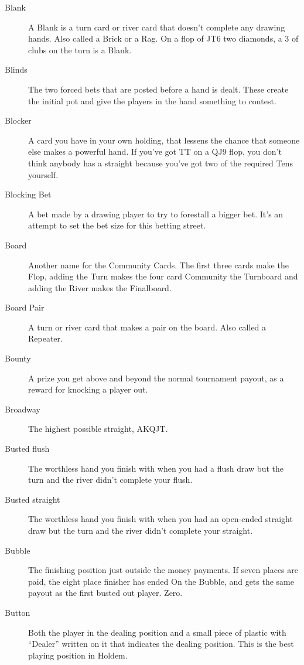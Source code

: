 \begin{description}
\item[Blank] A Blank is a turn card or river card that doesn't
complete any drawing hands. Also called a Brick or a Rag. On a flop of
JT6 two diamonds, a 3 of clubs on the turn is a Blank.

\item[Blinds] The two forced bets that are posted before a hand is
dealt. These create the initial pot and give the players in the hand
something to contest.

\item[Blocker] A card you have in your own holding, that lessens
the chance that someone else makes a powerful hand. If you've got TT
on a QJ9 flop, you don't think anybody has a straight because you've
got two of the required Tens yourself.

\item[Blocking Bet] A bet made by a drawing player to try to forestall
a  bigger bet. It's an attempt to set the bet size for this betting
street.

\item[Board] Another name for the Community Cards. The first three
cards make the Flop, adding the Turn makes the four card Community the
Turnboard and adding the River makes the Finalboard.

\item[Board Pair] A turn or river card that makes a pair on the
board. Also called a Repeater.

\item[Bounty] A prize you get above and beyond the normal tournament
payout, as a reward for knocking a player out.

\item[Broadway] The highest possible straight, AKQJT.

\item[Busted flush] The worthless hand you finish with when you had a
flush draw but the turn and the river didn't complete your flush.

\item[Busted straight] The worthless hand you finish with when you had
an open-ended straight draw but the turn and the river didn't complete
your straight.

\item[Bubble] The finishing position just outside the money payments.
If seven places are paid, the eight place finisher has ended On the
Bubble, and gets the same payout as the first busted out player. Zero.

\item[Button] Both the player in the dealing position and a small
piece of plastic with ``Dealer'' written on it that indicates the
dealing position. This is the best playing position in Holdem.


\end{description}
